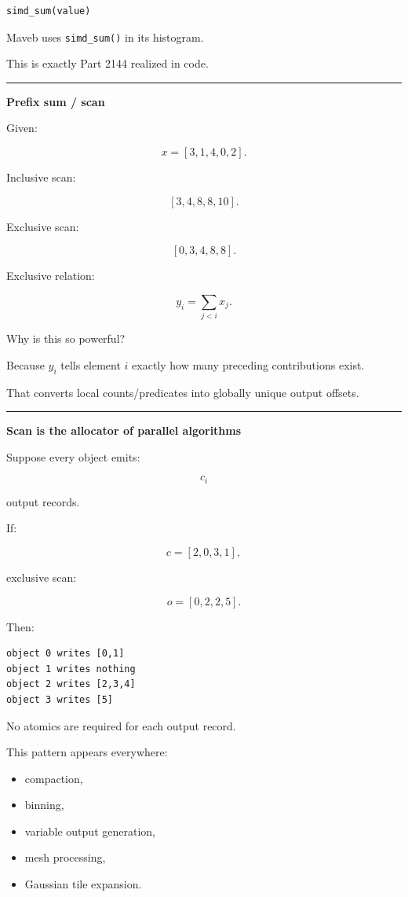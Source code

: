 \protect{}\label{jheza8}%
\begin{verbatim}
simd_sum(value)
\end{verbatim}

Maveb uses \texttt{simd\_sum()} in its histogram.

This is exactly Part 2144 realized in code.

\begin{center}\rule{0.5\linewidth}{0.5pt}\end{center}

\textbf{Prefix sum / scan}

Given:

\[
x=
[3,1,4,0,2].
\]

Inclusive scan:

\[
[3,4,8,8,10].
\]

Exclusive scan:

\[
\boxed{
[0,3,4,8,8].
}
\]

Exclusive relation:

\[
y_i=
\sum_{j<i}x_j.
\]

Why is this so powerful?

Because \(y_i\) tells element \(i\) exactly how many preceding contributions exist.

That converts local counts/predicates into globally unique output offsets.

\begin{center}\rule{0.5\linewidth}{0.5pt}\end{center}

\textbf{Scan is the allocator of parallel algorithms}

Suppose every object emits:

\[
c_i
\]

output records.

If:

\[
c=[2,0,3,1],
\]

exclusive scan:

\[
o=[0,2,2,5].
\]

Then:

\protect{}\label{9j7ww5}%
\begin{verbatim}
object 0 writes [0,1]
object 1 writes nothing
object 2 writes [2,3,4]
object 3 writes [5]
\end{verbatim}

No atomics are required for each output record.

This pattern appears everywhere:

\begin{itemize}
\tightlist
\item
  compaction,
\item
  binning,
\item
  variable output generation,
\item
  mesh processing,
\item
  Gaussian tile expansion.
\end{itemize}

